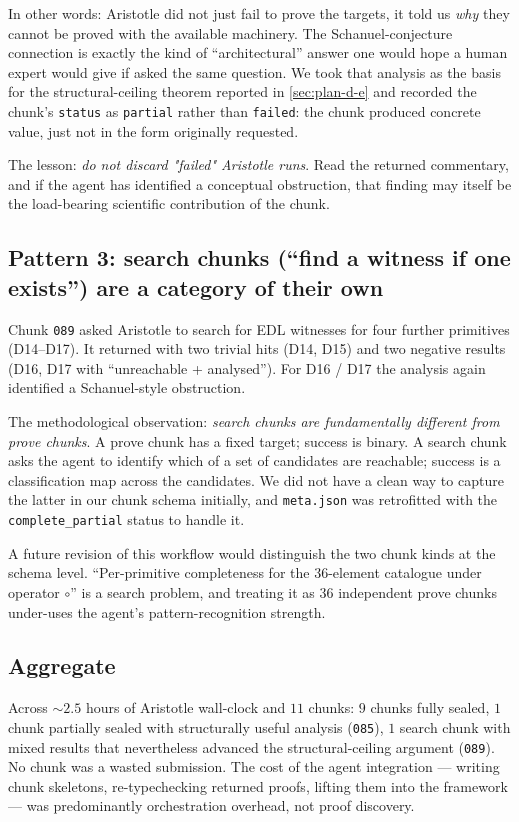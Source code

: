 \documentclass[11pt,a4paper]{article}
\theoremstyle{plain}
\theoremstyle{definition}
\begin{document}
In other words: Aristotle did not just fail to prove the targets, it
told us \emph{why} they cannot be proved with the available
machinery. The Schanuel-conjecture connection is exactly the kind of
``architectural'' answer one would hope a human expert would give if
asked the same question. We took that analysis as the basis for the
structural-ceiling theorem reported in \cref{sec:plan-d-e} and
recorded the chunk's \texttt{status} as \texttt{partial} rather than
\texttt{failed}: the chunk produced concrete value, just not in the
form originally requested.

The lesson: \emph{do not discard "failed" Aristotle runs}. Read the
returned commentary, and if the agent has identified a conceptual
obstruction, that finding may itself be the load-bearing scientific
contribution of the chunk.

\subsection*{Pattern 3: search chunks (``find a witness if one exists'')
are a category of their own}

Chunk \texttt{089} asked Aristotle to search for EDL witnesses for
four further primitives (D14--D17). It returned with two trivial
hits (D14, D15) and two negative results (D16, D17 with
``unreachable + analysed''). For D16 / D17 the analysis again
identified a Schanuel-style obstruction.

The methodological observation: \emph{search chunks are
fundamentally different from prove chunks}. A prove chunk has a
fixed target; success is binary. A search chunk asks the agent to
identify which of a set of candidates are reachable; success is a
classification map across the candidates. We did not have a clean
way to capture the latter in our chunk schema initially, and
\texttt{meta.json} was retrofitted with the \texttt{complete\_partial}
status to handle it.

A future revision of this workflow would distinguish the two chunk
kinds at the schema level. ``Per-primitive completeness for the
$36$-element catalogue under operator $\circ$'' is a search problem,
and treating it as $36$ independent prove chunks under-uses the
agent's pattern-recognition strength.

\subsection*{Aggregate}

Across $\sim$$2.5$ hours of Aristotle wall-clock and $11$ chunks: $9$
chunks fully sealed, $1$ chunk partially sealed with structurally
useful analysis (\texttt{085}), $1$ search chunk with mixed results
that nevertheless advanced the structural-ceiling argument
(\texttt{089}). No chunk was a wasted submission. The cost of the
agent integration --- writing chunk skeletons, re-typechecking
returned proofs, lifting them into the framework --- was
predominantly orchestration overhead, not proof discovery.
\end{document}
